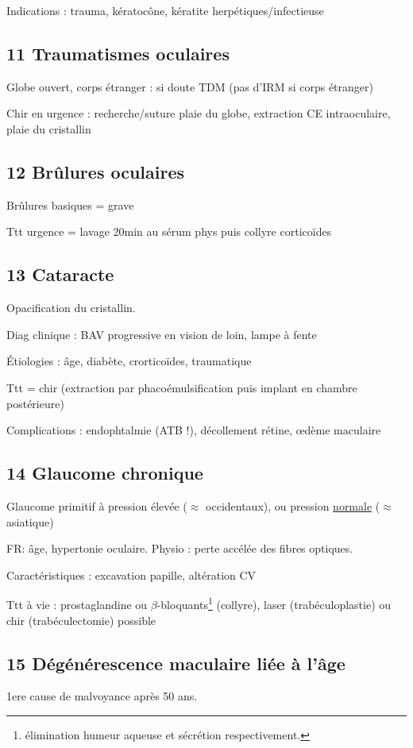 \documentclass[11pt]{article}
\begin{document}
Indications : trauma, kératocône, kératite herpétiques/infectieuse
\subsection{11 Traumatismes oculaires}
\label{sec:org77febaf}
Globe ouvert, corps étranger : si doute TDM (\danger pas d'IRM si corps
étranger)

Chir en urgence : recherche/suture plaie du globe, extraction CE intraoculaire,
plaie du cristallin
\subsection{12 Brûlures oculaires}
\label{sec:org9c538b5}
Brûlures basiques = grave \danger

Ttt urgence = lavage 20min au sérum phys puis collyre corticoïdes 
\subsection{13 Cataracte}
\label{sec:org28d6cf2}
Opacification du cristallin.

Diag clinique : BAV progressive en vision de loin, lampe à fente

Étiologies : âge, diabète, crorticoïdes, traumatique

Ttt = chir (extraction par phacoémulsification puis implant en chambre
postérieure)

Complications : endophtalmie (ATB !), décollement rétine, \oe{}dème maculaire
\subsection{14 Glaucome chronique}
\label{sec:org4aa2b2b}

Glaucome primitif à pression élevée (\(\approx\) occidentaux), ou pression \uline{normale}
(\(\approx\) asiatique)

FR: âge, hypertonie oculaire. Physio : perte accélée des fibres optiques.

Caractéristiques : \inc excavation papille, altération CV

Ttt à vie : prostaglandine ou \(\beta\)-bloquants\footnote{\inc élimination humeur aqueuse et \dec sécrétion respectivement.} (collyre), laser
(trabéculoplastie) ou chir (trabéculectomie) possible
\subsection{15 Dégénérescence maculaire liée à l'âge}
\label{sec:orga35d626}
1ere cause de malvoyance après 50 ans.
\end{document}
